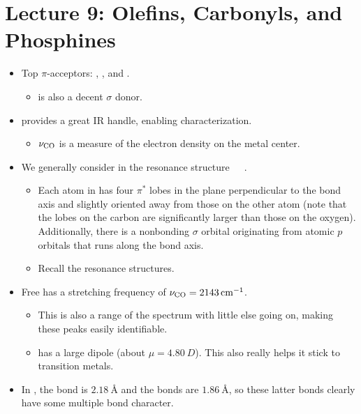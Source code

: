 \documentclass[../notes.tex]{subfiles}
\begin{document}
\section{Lecture 9: Olefins, Carbonyls, and Phosphines}
\begin{itemize}
    \item {}Top $\pi$-acceptors: , , and .
    \begin{itemize}
        \item {} is also a decent $\sigma$ donor.
    \end{itemize}
    \item {} provides a great IR handle, enabling characterization.
    \begin{itemize}
        \item $\nu_{\ce{CO}}$ is a measure of the electron density on the metal center.
    \end{itemize}
    \item We generally consider  in the resonance structure\ \ \ .
    \begin{itemize}
        \item Each atom in  has four $\pi^*$ lobes in the plane perpendicular to the bond axis and slightly oriented away from those on the other atom (note that the lobes on the carbon are significantly larger than those on the oxygen). Additionally, there is a nonbonding $\sigma$ orbital originating from atomic $p$ orbitals that runs along the bond axis.
        \item Recall the  resonance structures.
    \end{itemize}
    \item Free  has a stretching frequency of $\nu_{\ce{CO}}=\SI{2143}{\per\centi\meter}$.
    \begin{itemize}
        \item This is also a range of the spectrum with little else going on, making these peaks easily identifiable.
        \item {} has a large dipole (about $\mu=\SI{4.80}{D}$). This also really helps it stick to transition metals.
    \end{itemize}
    \item In , the  bond is $\SI{2.18}{\angstrom}$ and the  bonds are $\SI{1.86}{\angstrom}$, so these latter bonds clearly have some multiple bond character.

\end{itemize}
\end{document}
